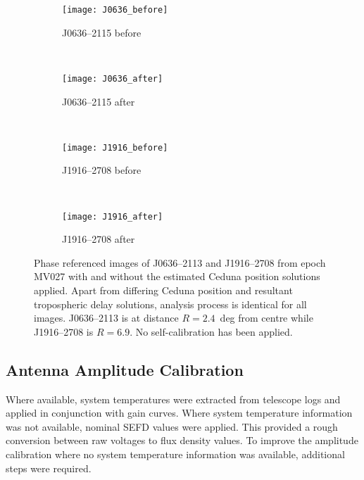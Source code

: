 					\begin{figure}[h]
						\centering
						\begin{subfigure}[t]{0.45\textwidth}
							\centering\texttt{[image: J0636\_before]}
							\caption{J0636--2115 before}
						\end{subfigure}
						~
						\begin{subfigure}[t]{0.45\textwidth}
							\centering\texttt{[image: J0636\_after]} 
							\caption{J0636--2115 after}
						\end{subfigure}
						~
						\begin{subfigure}[t]{0.45\textwidth}
							\vspace{1cm}
							\centering\texttt{[image: J1916\_before]}
							\caption{J1916--2708 before}
						\end{subfigure}
						~
						\begin{subfigure}[t]{0.45\textwidth}
							\vspace{1cm}
							\centering\texttt{[image: J1916\_after]} 
							\caption{J1916--2708 after}
						\end{subfigure}
						\caption[Before/After position correction]{Phase referenced images of J0636--2113 and J1916--2708 from epoch MV027 with and without the estimated Ceduna position solutions applied. Apart from differing Ceduna position and resultant tropospheric delay solutions, analysis process is identical for all images. J0636--2113 is at distance $R=2.4$~deg from centre while J1916--2708 is $R=6.9$. No self-calibration has been applied.}
						\label{fig:ceduna_pos_correct}
					\end{figure}
		
		\clearpage
		\subsection{Antenna Amplitude Calibration}
			Where available, system temperatures were extracted from telescope logs and applied in conjunction with gain curves. Where system temperature information was not available, nominal SEFD values were applied. This provided a rough conversion between raw voltages to flux density values. To improve the amplitude calibration where no system temperature information was available, additional steps were required. 
			
